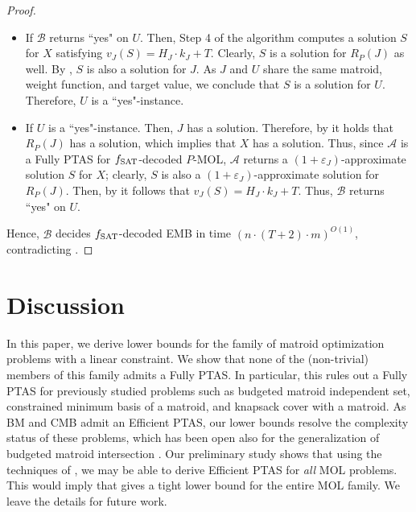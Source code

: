 \documentclass[11pt,letter]{article}
\newcommand{\cA}{{\mathcal{A}}}
\newcommand{\cB}{{\mathcal{B}}}
\newcommand{\fs}{f_{\textnormal{SAT}}}
\newcommand{\eps}{{\varepsilon}}
\begin{document}
\begin{proof}
	
	\begin{itemize}
		\item If $\cB$ returns ``yes" on $U$. %
		Then, Step 4 of the algorithm computes a solution $S$ for $X$ satisfying $v_J(S) = H_J \cdot k_J+T$. Clearly, $S$ is a solution for $R_P(J)$ as well. By , %
		$S$ is also a solution for $J$. As $J$ and $U$ share the same matroid, weight function, and target value, we conclude that $S$ is a solution for $U$. Therefore, $U$ is a ``yes"-instance.     
		
		
		\item If $U$ is a ``yes"-instance. Then, $J$ has a solution. Therefore, by  it holds that $R_P(J)$ has a solution, which implies that $X$ has a solution. Thus, since $\cA$ is a Fully PTAS for $\fs$-decoded $P$-MOL, $\cA$ returns a $(1+\eps_J)$-approximate solution $S$ for $X$; clearly, $S$ is also a $(1+\eps_J)$-approximate solution for $R_P(J)$. %
		Then, by  it follows that $v_J(S) = H_J \cdot k_J+T$. Thus, $\cB$ returns ``yes" on $U$.
	\end{itemize}  Hence, $\cB$ decides $\fs$-decoded EMB in time $\left(n \cdot (T+2) \cdot m\right)^{O(1)}$, contradicting .  
\end{proof}


	
	

	
%		  

%		  
		 
	
\section{Discussion}
\label{sec:discussion}

In this paper, we derive lower bounds for the family of matroid optimization problems with a linear constraint. We show that none of the (non-trivial) members of this family 
admits a Fully PTAS. In particular, this rules out a Fully PTAS for previously studied problems such as {\sc budgeted matroid independent set}, 
{\sc constrained minimum basis of a matroid},
and {\sc knapsack cover with a matroid}. 
As BM and CMB admit an Efficient PTAS,
our lower bounds resolve the complexity status of these problems, which has been
open also for the generalization of {\sc budgeted matroid intersection} \cite{CVZ11,BBGS11,DKS23b}. Our preliminary study shows that using the techniques of \cite{HL04}, we may be able to derive Efficient PTAS for {\em all}  MOL problems. This would imply that  gives a tight lower bound for the entire MOL family.
We leave the details for future work.  
\end{document}

